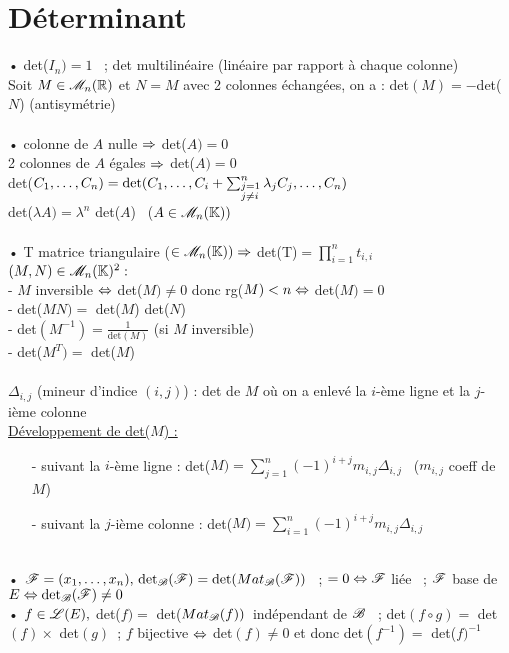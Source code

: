 \documentclass[12 pt]{book}
\begin{document}
\section*{Déterminant}

\begin{flushleft}
\begin{doublespace}

	• det($I_n) = 1$ \ ; det multilinéaire (linéaire par rapport à chaque colonne)\\
	Soit $M\in \mathscr{M}_n(\mathbb{R})$ et $N = M$ avec 2 colonnes échangées, on a : det$(M) = -$det($N$) (antisymétrie)\\
	
	\text{ }\\
	• colonne de $A$ nulle $\Rightarrow$ det($A) = 0$\\
	2 colonnes de $A$ égales $\Rightarrow$ det($A) = 0$\\
	det($C_1,\dots,C_n) = \text{det}(C_1, \dots, C_i + \sum_{\begin{subarray}{l} j=1 \\ j \ne i \end{subarray}}^n \lambda_j C_j , \dots, C_n)$\\
	det($\lambda A) = \lambda^n$ det($A$) \ ($A\in\mathscr{M}_n(\mathbb{K}))$\\
	
	\text{ }\\
	• T matrice triangulaire ($\in\mathscr{M}_n(\mathbb{K})) \Rightarrow$ det(T)$ = \prod_{i = 1}^n t_{i,i}$\\
	$(M,N)\in\mathscr{M}_n(\mathbb{K})^2 :$\\
	- $M$ inversible $\Leftrightarrow$ det($M) \ne 0$ donc rg($M) < n \Leftrightarrow$ det($M) = 0$\\
     - det($MN) = $ det($M$) det($N$)\\
	- det$(M^{-1}) = \frac{1}{\text{det}(M)}$ \; (si $M$ inversible)\\
	- det($M^T) =$ det($M$)\\
	\text{ }\\
	$\Delta_{i,j}$ (mineur d'indice $(i,j)$) : det de $M$ où on a enlevé la $i$-ème ligne et la $j$-ième colonne\\
	\underline{Développement de det($M$) :}\\
	\begin{itemize}
		\item[-] suivant la $i$-ème ligne : det($M) = \sum\limits_{j = 1}^n (- 1)^{i +j} m_{i,j} \Delta_{i,j}$ \ ($m_{i,j}$ coeff de $M$)
		\item[-]suivant la $j$-ième colonne : det($M) = \sum\limits_{i = 1}^n (- 1)^{i +j} m_{i,j} \Delta_{i,j}$ 
	\end{itemize}
	\text{}\\
	• $\mathscr{F} = (x_1, \dots, x_n),\, \text{det}_{\mathscr{B}}(\mathscr{F}) = \text{det}(Mat_{\mathscr{B}}(\mathscr{F}))$ \ ; $= 0 \Leftrightarrow \mathscr{F}$ liée \ ; $\mathscr{F}$ base de $E \Leftrightarrow \text{det}_{\mathscr{B}}(\mathscr{F}) \ne 0$\\	
	• $f\in\mathscr{L}(E),$ det($f) =$ det($Mat_{\mathscr{B}}(f))$\ \danger indépendant de $\mathscr{B}$ \ ; det$(f\circ g) =$ det$(f) \times$ det$(g)$\ ; $f$ bijective $\Leftrightarrow$ det$(f) \ne 0$ et donc det$(f^{- 1}) =$ det($f)^{- 1}$\\

\end{doublespace}
\end{flushleft}
\end{document}

